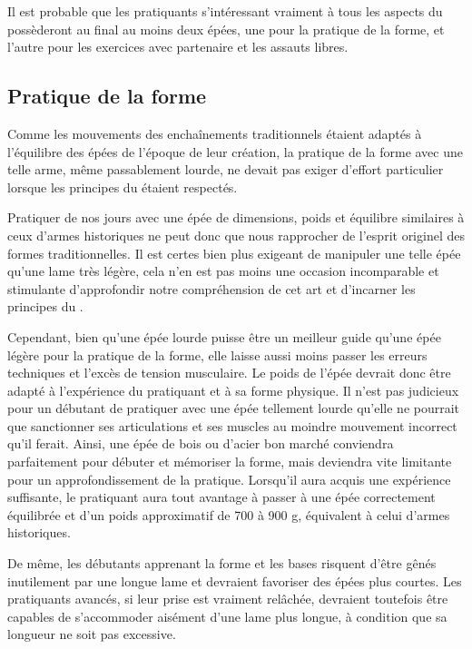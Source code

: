 Il est probable que les pratiquants s'intéressant vraiment à tous les aspects du \Taijijian{} possèderont au final au moins deux épées, une pour la pratique de la forme, et l'autre pour les exercices avec partenaire et les assauts libres.

\subsection{Pratique de la forme}
Comme les mouvements des enchaînements traditionnels étaient adaptés à l'équilibre des épées de l'époque de leur création, la pratique de la forme avec une telle arme, même passablement lourde, ne devait pas exiger d'effort particulier lorsque les principes du \Taiji{} étaient respectés.

Pratiquer de nos jours avec une épée de dimensions, poids et équilibre similaires à ceux d'armes historiques ne peut donc que nous rapprocher de l'esprit originel des formes traditionnelles.
Il est certes bien plus exigeant de manipuler une telle épée qu'une lame très légère, cela n'en est pas moins une occasion incomparable et stimulante d'approfondir notre compréhension de cet art et d'incarner les principes du \Taiji{}.

Cependant, bien qu'une épée lourde puisse être un meilleur guide qu'une épée légère pour la pratique de la forme, elle laisse aussi moins passer les erreurs techniques et l'excès de tension musculaire.
Le poids de l'épée devrait donc être adapté à l'expérience du pratiquant et à sa forme physique. Il n'est pas judicieux pour un débutant de pratiquer avec une épée tellement lourde qu'elle ne pourrait que sanctionner ses articulations et ses muscles au moindre mouvement incorrect qu'il ferait.
Ainsi, une épée de bois ou d'acier bon marché conviendra parfaitement pour débuter et mémoriser la forme, mais deviendra vite limitante pour un approfondissement de la pratique.
Lorsqu'il aura acquis une expérience suffisante, le pratiquant aura tout avantage à passer à une épée correctement équilibrée et d'un poids approximatif de 700 à 900 g, équivalent à celui d'armes historiques.

De même, les débutants apprenant la forme et les bases risquent d'être gênés inutilement par une longue lame et devraient favoriser des épées plus courtes. Les pratiquants avancés, si leur prise est vraiment relâchée, devraient toutefois être capables de s'accommoder aisément d'une lame plus longue, à condition que sa longueur ne soit pas excessive.

